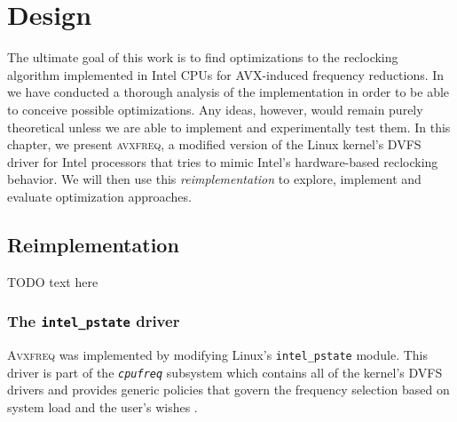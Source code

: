 \chapter{Design}
\label{sec:design}

The ultimate goal of this work is to find optimizations to the reclocking algorithm implemented in Intel \glspl{CPU} for \gls{AVX}-induced frequency reductions. In  we have conducted a thorough analysis of the implementation in order to be able to conceive possible optimizations. Any ideas, however, would remain purely theoretical unless we are able to implement and experimentally test them. In this chapter, we present \textsc{avxfreq}, a modified version of the Linux kernel's \gls{DVFS} driver for Intel processors that tries to mimic Intel's hardware-based reclocking behavior. We will then use this \emph{reimplementation} to explore, implement and evaluate optimization approaches.

\section{Reimplementation}

TODO text here

\subsection{The \texttt{intel\_pstate} driver}

\textsc{Avxfreq} was implemented by modifying Linux's \texttt{intel\_pstate} module. This driver is part of the \textit{\texttt{cpufreq}} subsystem which contains all of the kernel's \gls{DVFS} drivers and provides generic policies that govern the frequency selection based on system load and the user's wishes \cite{cpufreq}. %

